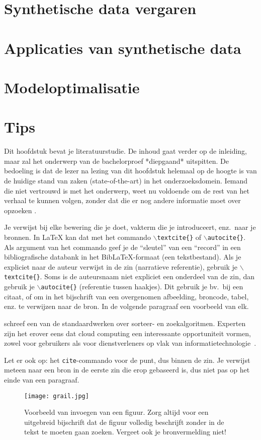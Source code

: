 \section{Synthetische data vergaren}
\section{Applicaties van synthetische data}
\section{Modeloptimalisatie}

\section{Tips}

Dit hoofdstuk bevat je literatuurstudie. De inhoud gaat verder op de inleiding, maar zal het onderwerp van de bachelorproef *diepgaand* uitspitten. De bedoeling is dat de lezer na lezing van dit hoofdstuk helemaal op de hoogte is van de huidige stand van zaken (state-of-the-art) in het onderzoeksdomein. Iemand die niet vertrouwd is met het onderwerp, weet nu voldoende om de rest van het verhaal te kunnen volgen, zonder dat die er nog andere informatie moet over opzoeken \autocite{Pollefliet2011}.

Je verwijst bij elke bewering die je doet, vakterm die je introduceert, enz.\ naar je bronnen. In \LaTeX{} kan dat met het commando \texttt{$\backslash${textcite\{\}}} of \texttt{$\backslash${autocite\{\}}}. Als argument van het commando geef je de ``sleutel'' van een ``record'' in een bibliografische databank in het Bib\LaTeX{}-formaat (een tekstbestand). Als je expliciet naar de auteur verwijst in de zin (narratieve referentie), gebruik je \texttt{$\backslash${}textcite\{\}}. Soms is de auteursnaam niet expliciet een onderdeel van de zin, dan gebruik je \texttt{$\backslash${}autocite\{\}} (referentie tussen haakjes). Dit gebruik je bv.~bij een citaat, of om in het bijschrift van een overgenomen afbeelding, broncode, tabel, enz. te verwijzen naar de bron. In de volgende paragraaf een voorbeeld van elk.

\textcite{Knuth1998} schreef een van de standaardwerken over sorteer- en zoekalgoritmen. Experten zijn het erover eens dat cloud computing een interessante opportuniteit vormen, zowel voor gebruikers als voor dienstverleners op vlak van informatietechnologie~\autocite{Creeger2009}.

Let er ook op: het \texttt{cite}-commando voor de punt, dus binnen de zin. Je verwijst meteen naar een bron in de eerste zin die erop gebaseerd is, dus niet pas op het einde van een paragraaf.

\begin{figure}
    \centering
    \texttt{[image: grail.jpg]}
    \caption[Voorbeeld figuur.]{\label{fig:grail}Voorbeeld van invoegen van een figuur. Zorg altijd voor een uitgebreid bijschrift dat de figuur volledig beschrijft zonder in de tekst te moeten gaan zoeken. Vergeet ook je bronvermelding niet!}
\end{figure}